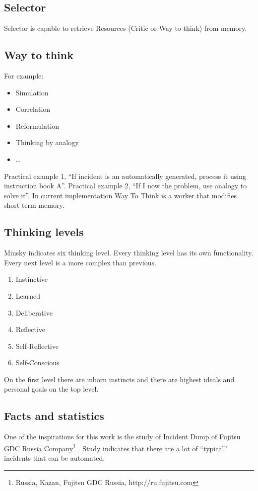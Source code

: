 \documentclass[12pt]{article}
\begin{document}
\subsection{Selector}
Selector is capable to retrieve Resources (Critic or Way to think) from memory.

\subsection{Way to think}

For example:
\begin{itemize}
 \item Simulation
 \item Correlation
 \item Reformulation
 \item Thinking by analogy
 \item …
\end{itemize}

Practical example 1, “If incident is an automatically generated, process it using instruction book A”.
Practical example 2, “If I now the problem, use analogy to solve it”. In current implementation Way To Think is a worker that modifies short term memory.

\subsection{Thinking levels}

Minsky indicates six thinking level. Every thinking level has its own functionality. Every next level is a more complex than previous.

\begin{enumerate}
 \item Instinctive
 \item Learned
 \item Deliberative
 \item Reflective
 \item Self-Reflective
 \item Self-Conscious
\end{enumerate}
On the first level there are inborn instincts and there are highest ideals and personal goals on the top level.

\subsection{Facts and statistics}
One of the inspirations for this work is the study of Incident Dump of Fujitsu GDC Russia Company\footnote{Russia, Kazan, Fujitsu GDC Russia, http://ru.fujitsu.com} . Study indicates that there are a lot of “typical” incidents that can be automated.
\end{document}
